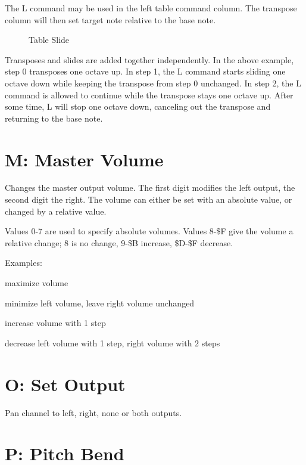 The L command may be used in the left table command column. The transpose column will then set target note relative to the base note.

\begin{figure}[htbp]
	\begin{center}
		\caption{Table Slide}
	\end{center}
\end{figure}

Transposes and slides are added together independently. In the above example, step 0 transposes one octave up. In step 1, the L command starts sliding one octave down while keeping the transpose from step 0 unchanged. In step 2, the L command is allowed to continue while the transpose stays one octave up. After some time, L will stop one octave down, canceling out the transpose and returning to the base note.

\section{M: Master Volume}

Changes the master output volume. The first digit modifies the left output, the second digit the right. The volume can either be set with an absolute value, or changed by a relative value.

Values 0-7 are used to specify absolute volumes. Values 8-\$F give the volume a relative change; 8 is no change, 9-\$B increase, \$D-\$F decrease.

\begin{description}
\item Examples:
\item[M77] maximize volume
\item[M08] minimize left volume, leave right volume unchanged
\item[M99] increase volume with 1 step
\item[MFE] decrease left volume with 1 step, right volume with 2 steps
\end{description}

\section{O: Set Output}

Pan channel to left, right, none or both outputs.

\section{P: Pitch Bend}

